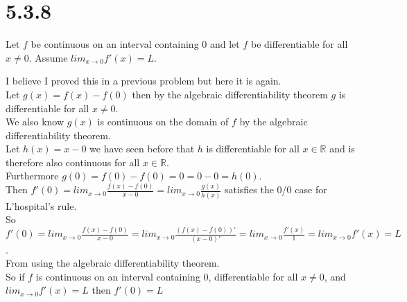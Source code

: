 \documentclass{article}
\begin{document}
\section*{5.3.8} Let $f$ be continuous on an interval containing 0 and let $f$ be differentiable for all $x\neq 0$. Assume $lim_{x\rightarrow 0} f'(x) = L$.
\begin{center}
    \doublespacing
    I believe I proved this in a previous problem but here it is again.
    \\Let $g(x) = f(x) - f(0)$ then by the algebraic differentiability theorem $g$ is differentiable for all $x\neq 0$.
    \\We also know $g(x)$ is continuous on the domain of $f$ by the algebraic differentiability theorem.
    \\Let $h(x) = x - 0$ we have seen before that $h$ is differentiable for all $x\in\mathbb{R}$ and is therefore also continuous for all $x\in\mathbb{R}$.
    \\Furthermore $g(0) = f(0) - f(0) = 0 = 0 - 0 = h(0)$.
    \\Then $f'(0) = lim_{x\rightarrow 0}\frac{f(x) - f(0)}{x - 0} = lim_{x\rightarrow 0}\frac{g(x)}{h(x)}$ satisfies the 0/0 case for L'hospital's rule.
    \\So $f'(0) = lim_{x\rightarrow 0}\frac{f(x) - f(0)}{x - 0} = lim_{x\rightarrow 0}\frac{(f(x) - f(0))'}{(x - 0)'} = lim_{x\rightarrow 0}\frac{f'(x)}{1} = lim_{x\rightarrow 0} f'(x) = L$.
    \\From using the algebraic differentiability theorem.
    \\So if $f$ is continuous on an interval containing 0, differentiable for all $x\neq 0$, and $lim_{x\rightarrow 0} f'(x) = L$ then $f'(0) = L$ \qedsymbol
\end{center}


\newpage
\end{document}
